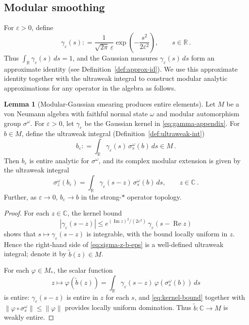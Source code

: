 \documentclass[11pt,a4paper]{article}
\theoremstyle{plain}
\numberwithin{theorem}{section}
\theoremstyle{definition}
\newtheorem{lemma}[theorem]{Lemma}
\newcommand{\?}{\overset{?}{=}}
\newcommand{\defeq}{\mathrel{\mathop:}=}
\renewcommand{\Re}{\operatorname{Re}}
\renewcommand{\Im}{\operatorname{Im}}
\newcommand{\ve}{\varepsilon}
\newcommand{\g}{\gamma}
\newcommand{\s}{\sigma}
\newcommand{\w}{\omega}
\begin{document}
\begin{appendix}
\subsection{Modular smoothing}

For $\varepsilon>0$, define
\begin{equation}\label{eq:gamma-appendix}
  \gamma_\varepsilon(s)\defeq \frac{1}{\sqrt{2\pi}\,\varepsilon}
  \exp\left(-\frac{s^2}{2\varepsilon^2}\right),
  \qquad s\in\mathbb R\,.
\end{equation}
Thus $\int_{\mathbb R}\gamma_\varepsilon(s)\,ds=1$, and the Gaussian measures $\g_\ve(s)\,ds$ form an approximate identity (see Definition~\ref{def:approx-id}). We use this approximate identity together with the ultraweak integral to construct modular analytic approximations for any operator in the algebra as follows.

\begin{lemma}[Modular-Gaussian smearing produces entire elements]
\label{lem:gaussian-modular-entire}
Let $M$ be a von Neumann algebra with faithful normal state $\w$ and modular automorphism group $\s^\w$.  For $\ve>0$, let $\g_\ve$ be the Gaussian kernel in \eqref{eq:gamma-appendix}.
For $b\in M$, define the ultraweak integral (Definition~\ref{def:ultraweak-int})
\begin{equation}
\label{eq:b-eps-def}
  b_\ve\defeq \int_{\mathbb R}\g_\ve(s)\,\s^\w_s(b)\,ds\in M\,.
\end{equation}
Then $b_\ve$ is entire analytic for $\s^\w$, and its complex modular extension is given by the ultraweak integral
\begin{equation}
\label{eq:sigma-z-b-eps}
  \s^\w_z(b_\ve)=\int_{\mathbb R}\g_\ve(s-z)\,\s^\w_s(b)\,ds,\qquad z\in\mathbb C\,.
\end{equation}
Further, as $\ve\to0$, $b_\ve\to b$ in the strong-$*$ operator topology.
\end{lemma}

\begin{proof}
For each $z\in\mathbb C$, the kernel bound
\begin{equation}
\label{eq:kernel-bound}
  |\g_\ve(s-z)|\le e^{(\Im z)^2/(2\ve^2)}\,\g_\ve(s-\Re z)
\end{equation}
shows that $s\mapsto\g_\ve(s-z)$ is integrable, with the bound locally uniform in $z$.  Hence the right-hand side of \eqref{eq:sigma-z-b-eps} is a well-defined ultraweak integral; denote it by $\widetilde b(z)\in M$.

For each $\varphi\in M_*$, the scalar function
\begin{equation}
  z\mapsto\varphi(\widetilde b(z))=\int_{\mathbb R}\g_\ve(s-z)\,\varphi(\s^\w_s(b))\,ds
\end{equation}
is entire: $\g_\ve(s-z)$ is entire in $z$ for each $s$, 
and \eqref{eq:kernel-bound} together with $\|\varphi\circ\s^\w_s\|\le\|\varphi\|$ provides locally uniform domination.  Thus $\widetilde b:\mathbb C\to M$ is weakly entire.


\end{proof}
\end{appendix}
\end{document}

